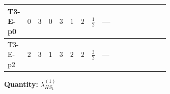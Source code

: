 \documentclass[8pt]{article}
\begin{document}
\begin{landscape}
\begin{longtable}{@{}llcccccc >{\raggedright\arraybackslash}p{0.21\linewidth} >{\raggedright\arraybackslash}p{0.21\linewidth} >{\raggedright\arraybackslash}p{0.21\linewidth}@{}}
\midrule
T3-E-p0 & $0$ & $3$ & $0$ & $3$ & $1$ & $2$ & $\frac{1}{2}$ & --- & \scriptsize\adjustbox{max width=\linewidth}{$\begin{gathered} -2 \operatorname{Tr}\!\left({y_1}\,\left({y_1}\right)^{\dagger}\,{Y_e}\,\left({Y_e}\right)^{\dagger}\right)\end{gathered}$} & \scriptsize\adjustbox{max width=\linewidth}{$\begin{gathered} +4 {\lambda_5} \left({\lambda_5}\right)^{*}\end{gathered}$} \\
\midrule
T3-E-p2 & $2$ & $3$ & $1$ & $3$ & $2$ & $2$ & $\frac{3}{2}$ & --- & \scriptsize\adjustbox{max width=\linewidth}{$\begin{gathered} -2 \operatorname{Tr}\!\left({y_1}\,\left({y_1}\right)^{\dagger}\,{Y_e}\,\left({Y_e}\right)^{\dagger}\right)\end{gathered}$} & \scriptsize\adjustbox{max width=\linewidth}{$\begin{gathered} +4 {\lambda_5} \left({\lambda_5}\right)^{*}\end{gathered}$} \\
\midrule
\bottomrule
\end{longtable}
\clearpage
\noindent\textbf{Quantity: }$\lambda_{HS_1}^{(1)}$\par\smallskip

\end{landscape}
\end{document}
